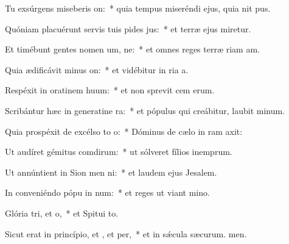 \item Tu exsúrgens miseberis on:~* quia tempus miseréndi ejus, quia nit pus.
\item Quóniam placuérunt servis tuis pides jus:~* et terræ ejus miretur.
\item Et timébunt gentes nomen um, ne:~* et omnes reges terræ riam am.
\item Quia ædificávit minus on:~* et vidébitur in ria a.
\item Respéxit in oratinem huum:~* et non sprevit cem erum.
\item Scribántur hæc in generatine ra:~* et pópulus qui creábitur, laubit minum.
\item Quia prospéxit de excélso to o:~* Dóminus de cælo in ram axit:
\item Ut audíret gémitus comdirum:~* ut sólveret fílios inemprum.
\item Ut annúntient in Sion men ni:~* et laudem ejus  Jesalem.
\item In conveniéndo pópu in num:~* et reges ut viant mino.
\item Glória tri, et o,~* et Spitui to.
\item Sicut erat in princípio, et , et per,~* et in sǽcula sæcurum. men.
